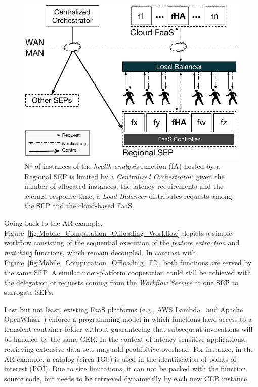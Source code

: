 \begin{figure}[bp]
	\centering
	\includegraphics[width=\linewidth]{Figs/Edge_Data_Analytics_Personal_Assistant.pdf}
	\caption{Nº of instances of the \textit{health analysis} function (fA) hosted by a Regional SEP is limited by a \textit{Centralized Orchestrator}; given the number of allocated instances, the latency requirements and the average response time, a \textit{Load Balancer} distributes requests among the SEP and the cloud-based FaaS.}
	\label{fig:Edge_Data_Analytics_Personal_Assistant}
\end{figure}

Going back to the AR example, Figure~\ref{fig:Mobile_Computation_Offloading_Workflow} depicts a simple workflow consisting of the sequential execution of the \textit{feature extraction} and \textit{matching} functions, which remain decoupled. In contrast with Figure~\ref{fig:Mobile_Computation_Offloading_F2}, both functions are served by the same SEP. A similar inter-platform cooperation could still be achieved with the delegation of requests coming from the \textit{Workflow Service} at one SEP to surrogate SEPs.

Last but not least, existing FaaS platforms (e.g., AWS Lambda~\cite{AWSLambda} and Apache OpenWhisk~\cite{OpenWhisk}) enforce a programming model in which functions have access to a transient container folder without guaranteeing that subsequent invocations will be handled by the same CER. %
In the context of latency-sensitive applications, retrieving extensive data sets may add prohibitive overhead. For instance, in the AR example, a catalog (circa 1Gb) is used in the identification of points of interest (POI).
Due to size limitations, it can not be packed with the function source code, but needs to be retrieved dynamically by each new CER instance.

